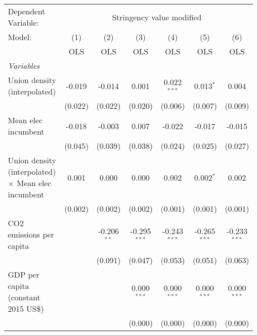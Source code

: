 
\begingroup
\centering
\begin{tabular}{lcccccc}
   \toprule
   Dependent Variable: & \multicolumn{6}{c}{Stringency value modified}\\
   Model:                                                     & (1)     & (2)           & (3)            & (4)            & (5)            & (6)\\  
                                                              &  OLS    & OLS           & OLS            & OLS            & OLS            & OLS\\  
   \midrule
   \emph{Variables}\\
   Union density (interpolated)                               & -0.019  & -0.014        & 0.001          & 0.022$^{***}$  & 0.013$^{*}$    & 0.004\\   
                                                              & (0.022) & (0.022)       & (0.020)        & (0.006)        & (0.007)        & (0.009)\\   
   Mean elec incumbent                                        & -0.018  & -0.003        & 0.007          & -0.022         & -0.017         & -0.015\\   
                                                              & (0.045) & (0.039)       & (0.038)        & (0.024)        & (0.025)        & (0.027)\\   
   Union density (interpolated) $\times$ Mean elec incumbent  & 0.001   & 0.000         & 0.000          & 0.002          & 0.002$^{*}$    & 0.002\\   
                                                              & (0.002) & (0.002)       & (0.002)        & (0.001)        & (0.001)        & (0.001)\\   
   CO2 emissions per capita                                   &         & -0.206$^{**}$ & -0.295$^{***}$ & -0.243$^{***}$ & -0.265$^{***}$ & -0.233$^{***}$\\   
                                                              &         & (0.091)       & (0.047)        & (0.053)        & (0.051)        & (0.063)\\   
   GDP per capita (constant 2015 US\$)                        &         &               & 0.000$^{***}$  & 0.000$^{***}$  & 0.000$^{***}$  & 0.000$^{***}$\\   
                                                              &         &               & (0.000)        & (0.000)        & (0.000)        & (0.000)\\   

\end{tabular}
